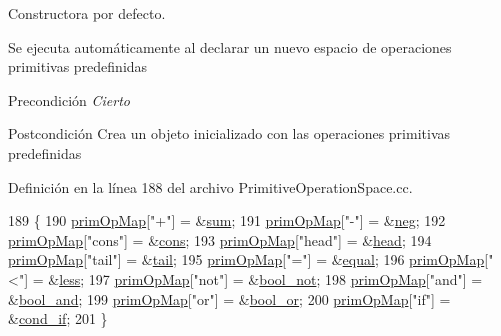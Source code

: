 Constructora por defecto. 

Se ejecuta automáticamente al declarar un nuevo espacio de operaciones primitivas predefinidas \begin{DoxyPrecond}{Precondición}
{\itshape Cierto} 
\end{DoxyPrecond}
\begin{DoxyPostcond}{Postcondición}
Crea un objeto inicializado con las operaciones primitivas predefinidas 
\end{DoxyPostcond}


Definición en la línea 188 del archivo Primitive\+Operation\+Space.\+cc.


\begin{DoxyCode}
189 \{
190   \hyperlink{class_primitive_operation_space_afd359615001ed1e9b44b9618287834ec}{primOpMap}[\textcolor{stringliteral}{"+"}] = &\hyperlink{class_primitive_operation_space_aa30a58f2003a097535af96ea40b03429}{sum};
191   \hyperlink{class_primitive_operation_space_afd359615001ed1e9b44b9618287834ec}{primOpMap}[\textcolor{stringliteral}{"-"}] = &\hyperlink{class_primitive_operation_space_a2ac4306bae8330f3eb73f5ef8926dfda}{neg};
192   \hyperlink{class_primitive_operation_space_afd359615001ed1e9b44b9618287834ec}{primOpMap}[\textcolor{stringliteral}{"cons"}] = &\hyperlink{class_primitive_operation_space_a4d80dbbbc29a79c286df7c8d7f351111}{cons};
193   \hyperlink{class_primitive_operation_space_afd359615001ed1e9b44b9618287834ec}{primOpMap}[\textcolor{stringliteral}{"head"}] = &\hyperlink{class_primitive_operation_space_a97c2b5092e2465c7deb1aff6ceccc7de}{head};
194   \hyperlink{class_primitive_operation_space_afd359615001ed1e9b44b9618287834ec}{primOpMap}[\textcolor{stringliteral}{"tail"}] = &\hyperlink{class_primitive_operation_space_a08ecc4d0207c93ab245f05732e0024c3}{tail};
195   \hyperlink{class_primitive_operation_space_afd359615001ed1e9b44b9618287834ec}{primOpMap}[\textcolor{stringliteral}{"="}] = &\hyperlink{class_primitive_operation_space_a0a18ec45c82366aea7d1a39ec3b6bb57}{equal};
196   \hyperlink{class_primitive_operation_space_afd359615001ed1e9b44b9618287834ec}{primOpMap}[\textcolor{stringliteral}{"<"}] = &\hyperlink{class_primitive_operation_space_aa5b70cdd115a646d48f686fd49cdedb1}{less};
197   \hyperlink{class_primitive_operation_space_afd359615001ed1e9b44b9618287834ec}{primOpMap}[\textcolor{stringliteral}{"not"}] = &\hyperlink{class_primitive_operation_space_afcb171950067a1a6638b01c916900c78}{bool\_not};
198   \hyperlink{class_primitive_operation_space_afd359615001ed1e9b44b9618287834ec}{primOpMap}[\textcolor{stringliteral}{"and"}] = &\hyperlink{class_primitive_operation_space_a741c40c2ced4d13a87b4ee5c849abdfd}{bool\_and};
199   \hyperlink{class_primitive_operation_space_afd359615001ed1e9b44b9618287834ec}{primOpMap}[\textcolor{stringliteral}{"or"}] = &\hyperlink{class_primitive_operation_space_abb131ec0899228bc3fe2ed54d5c0ebc9}{bool\_or};
200   \hyperlink{class_primitive_operation_space_afd359615001ed1e9b44b9618287834ec}{primOpMap}[\textcolor{stringliteral}{"if"}] = &\hyperlink{class_primitive_operation_space_abbb7fc1afddfa5c5041ac8adfa4a2d55}{cond\_if};
201 \}
\end{DoxyCode}
